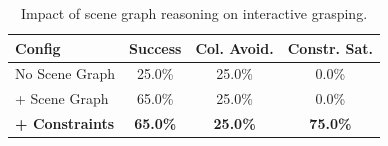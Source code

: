 \begin{table}[t]
\centering
\caption{Impact of scene graph reasoning on interactive grasping.}
\label{tab:scene_graph}
\begin{tabular}{@{}lccc@{}}
\toprule
\textbf{Config} & \textbf{Success} & \textbf{Col. Avoid.} & \textbf{Constr. Sat.} \\
\midrule
No Scene Graph & 25.0\% & 25.0\% & 0.0\% \\
+ Scene Graph & 65.0\% & 25.0\% & 0.0\% \\
\textbf{+ Constraints} & \textbf{65.0\%} & \textbf{25.0\%} & \textbf{75.0\%} \\
\bottomrule
\end{tabular}
\end{table}